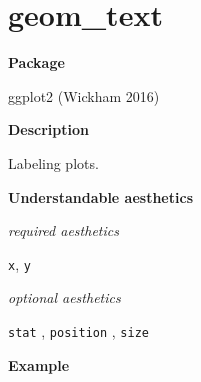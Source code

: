 \documentclass[
  letterpaper,
  DIV=11,
  numbers=noendperiod]{scrreprt}
\begin{document}
\section{geom\_text}\label{text}

\textbf{Package}

ggplot2 (Wickham 2016)

\textbf{Description}

Labeling plots.

\textbf{Understandable aesthetics}

\emph{required aesthetics}

\texttt{x}, \texttt{y}

\emph{optional aesthetics}

\texttt{stat} , \texttt{position} , \texttt{size}

\textbf{Example}
\end{document}
